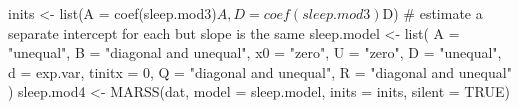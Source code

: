 \begin{Schunk}
\begin{Sinput}
 inits <- list(A = coef(sleep.mod3)$A, D = coef(sleep.mod3)$D)
 # estimate a separate intercept for each but slope is the same
 sleep.model <- list(
   A = "unequal", B = "diagonal and unequal", x0 = "zero", U = "zero",
   D = "unequal", d = exp.var, tinitx = 0, Q = "diagonal and unequal",
   R = "diagonal and unequal"
 )
 sleep.mod4 <- MARSS(dat, model = sleep.model, inits = inits, silent = TRUE)
\end{Sinput}
\end{Schunk}
